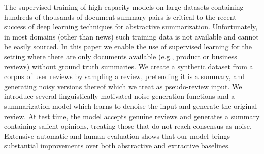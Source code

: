 The supervised training of high-capacity models on large datasets containing hundreds of thousands of document-summary pairs is critical to the recent success of deep learning techniques for abstractive summarization. Unfortunately, in most domains (other than news) such training data is not available and cannot be easily sourced. In this paper we enable the use of supervised learning for the setting where there are only documents available (e.g., product or business reviews) without ground truth summaries. We create a synthetic dataset from a corpus of user reviews by sampling a review, pretending it is a summary, and generating noisy versions thereof which we treat as pseudo-review input. We introduce several linguistically motivated noise generation functions and a summarization model which learns to denoise the input and generate the original review. At test time, the model accepts genuine reviews and generates a summary containing salient opinions, treating those that do not reach consensus as noise. Extensive automatic and human evaluation shows that our model brings substantial improvements over both abstractive and extractive baselines.
